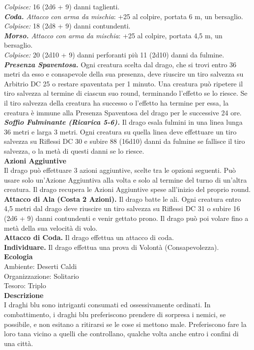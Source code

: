 \begin{multicols}{2}
\emph{Colpisce:} 16 (2d6 + 9) danni taglienti.\\
\emph{\textbf{Coda.} Attacco con arma da mischia}: +25 al colpire, portata 6 m, un bersaglio.\\
\emph{Colpisce:} 18 (2d8 + 9) danni contundenti.\\
\emph{\textbf{Morso.} Attacco con arma da mischia}: +25 al colpire, portata 4,5 m, un bersaglio.\\
\emph{Colpisce:} 20 (2d10 + 9) danni perforanti più 11 (2d10) danni da fulmine.\\
\emph{\textbf{Presenza Spaventosa.}} Ogni creatura scelta dal drago, che si trovi entro 36 metri da esso e consapevole della sua presenza, deve riuscire un tiro salvezza su Arbitrio DC  25 o restare spaventata per 1 minuto. Una creatura può ripetere il tiro salvezza al termine di ciascun suo round, terminando l'effetto se lo riesce. Se il tiro salvezza della creatura ha successo o l'effetto ha termine per essa, la creatura è immune alla Presenza Spaventosa del drago per le successive 24 ore.\\
\emph{\textbf{Soffio Fulminante (Ricarica 5-6).}} Il drago esala fulmini in una linea lunga 36 metri e larga 3 metri. Ogni creatura su quella linea deve effettuare un tiro salvezza su Riflessi DC  30 e subire 88 (16d10) danni da fulmine se fallisce il tiro salvezza, o la metà di questi danni se lo riesce.\\
\textbf{Azioni Aggiuntive}\\
Il drago può effettuare 3 azioni aggiuntive, scelte tra le opzioni seguenti. Può usare solo un'Azione Aggiuntiva alla volta e solo al termine del turno di un'altra creatura. Il drago recupera le Azioni Aggiuntive spese all'inizio del proprio round.\\
\textbf{Attacco di Ala (Costa 2 Azioni).} Il drago batte le ali. Ogni creatura entro 4,5 metri dal drago deve riuscire un tiro salvezza su Riflessi DC  31 o subire 16 (2d6 + 9) danni contundenti e venir gettato prono. Il drago può poi volare fino a metà della sua velocità di volo.\\
\textbf{Attacco di Coda.} Il drago effettua un attacco di coda.\\
\textbf{Individuare.} Il drago effettua una prova di Volontà (Consapevolezza).\\
\textbf{Ecologia}\\
Ambiente: Deserti Caldi\\
Organizzazione: Solitario\\
Tesoro: Triplo\\
\textbf{Descrizione}\\
I draghi blu sono intriganti consumati ed ossessivamente ordinati. In combattimento, i draghi blu preferiscono prendere di sorpresa i nemici, se possibile, e non esitano a ritirarsi se le cose si mettono male. Preferiscono fare la loro tana vicino a quelli che controllano, qualche volta anche entro i confini di una città.\\


\end{multicols}
